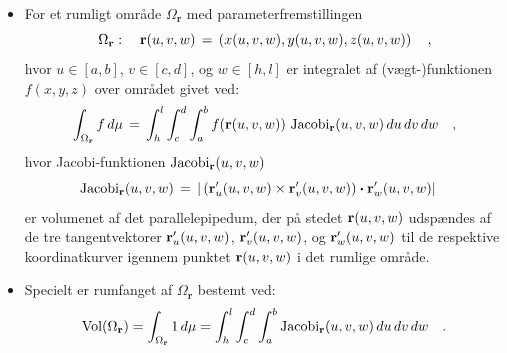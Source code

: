 \begin{summary}
\begin{itemize}
\item For et rumligt område $\Omega_{\mathbf{r}}$ med parameterfremstillingen
\begin{equation}
\Omega_{\mathbf{r}}: \quad {\bf r}(u,v,w) \, = \, \left(x(u,v,w), y(u,v,w),
z(u,v,w)\right) \quad ,
\end{equation}
hvor $u \in [a,b]$, $v \in [c,d]$, og $w \in [h, l]$
er integralet af (vægt-)funktionen $f(x,y,z)$ over området givet ved:
\begin{equation}
\int_{\Omega_{\mathbf{r}}} f \, d\mu \, = \, \int_{h}^{l} \int_{c}^{d} \int_{a}^{b}
f({\bf r}(u,v,w))\, \operatorname{Jacobi}_{\bf r}(u,v,w)\,du \, dv \, dw \quad,
\end{equation}
hvor {Jacobi-funktionen  $\operatorname{Jacobi}_{\bf r}(u,v,w)$}
\begin{equation}
 \operatorname{Jacobi}_{\bf r}(u,v,w)\, = \,  | \left({\bf r}'_{u}(u,v,w) \times {\bf
 r}'_{v}(u,v,w)\right) \bm{\cdot} {\bf r}'_{w}(u,v,w)|  \quad
\end{equation}
er volumenet af det parallelepipedum, der på stedet
${\bf r}(u,v,w)$ udspændes af de tre tangentvektorer
${\bf r}'_{u}(u,v,w)$, ${\bf
 r}'_{v}(u,v,w)$, og ${\bf
 r}'_{w}(u,v,w)$ til de respektive koordinatkurver igennem punktet
${\bf r}(u,v,w)$ i det rumlige område.
\item Specielt er rumfanget af $\Omega_{\mathbf{r}}$ bestemt ved:
\begin{equation}
\operatorname{Vol}(\Omega_{\mathbf{r}}) = \int_{\Omega_{\mathbf{r}}} 1 \, d\mu = \int_{h}^{l} \int_{c}^{d} \int_{a}^{b} \operatorname{Jacobi}_{\bf r}(u,v,w)\,du \, dv \, dw \quad.
\end{equation}
\end{itemize}
\end{summary}






